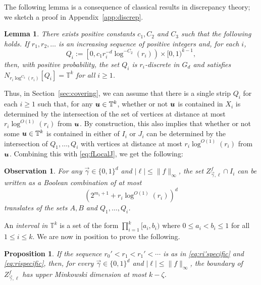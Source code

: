 \documentclass[12pt,a4paper]{amsart}
\numberwithin{equation}{section}
\newtheorem{lemma}[equation]{Lemma}
\newtheorem{proposition}[equation]{Proposition}
\newtheorem{obs}[equation]{Observation}
\theoremstyle{definition}
\begin{document}
The following lemma is a consequence of classical results in discrepancy theory; we sketch a proof in Appendix~\ref{app:discrep}.


\begin{lemma}
\label{lem:stripLem}
There exists positive constants $c_1,C_2$ and $C_3$ such that the following holds. If $r_1,r_2,\dots$ is an increasing sequence of positive integers and, for each $i$,  
\[Q_i:=\left[0, c_1r_i^{-d}\log^{-C_2}(r_i)\right)\times [0,1)^{k-1},\]
then, with positive probability, the set $Q_i$ is $r_i$-discrete in $G_d$ and satisfies $N_{r_i\log^{C_3}(r_i)}[Q_{i}]=\mathbb{T}^k$ for all $i\geq1$.
\end{lemma}

Thus, in Section~\ref{sec:covering}, we can assume that there is a single strip $Q_i$ for each $i\geq1$ such that, for any $\boldsymbol{u}\in \mathbb{T}^k$, whether or not $\boldsymbol{u}$ is contained in $X_i$ is determined by the intersection of the set of vertices at distance at most $r_i\log^{O(1)}(r_i)$ from $\boldsymbol{u}$. By construction, this also implies that whether or not some $\boldsymbol{u}\in\mathbb{T}^k$ is contained in either of $I_i$ or $J_i$ can be determined by the intersection of $Q_1,\dots,Q_i$ with vertices at distance at most $r_i\log^{O(1)}(r_i)$ from $\boldsymbol{u}$. Combining this with \eqref{eq:fLocalJ}, we get the following:

\begin{obs}
\label{obs:booleanABQ}
For any $\vec{\gamma}\in \{0,1\}^d$ and $|\ell|\leq \|f\|_\infty$, the set $Z_{\vec{\gamma},\ell}^f\cap I_i$ can be written as a Boolean combination of at most
\[\left(2^{m_i+1} + r_i\log^{O(1)}(r_i)\right)^d\] 
translates of the sets $A,B$ and $Q_1,\dots,Q_i$. 
\end{obs} 

An \emph{interval in} $\mathbb{T}^k$ is a set of the form $\prod_{i=1}^k[a_i,b_i)$ where $0\leq a_i<b_i\leq 1$ for all $1\leq i\leq k$.  We are now in position to prove the following.

\begin{proposition}
\label{prop:bdyDim}
If the sequence $r_0'<r_1<r_1'<\cdots$ is as in \eqref{eq:ri'specific} and \eqref{eq:rispecific}, then, for every $\vec{\gamma}\in\{0,1\}^d$ and $|\ell|\leq \|f\|_\infty$, the boundary of $Z_{\vec{\gamma},\ell}^f$ has upper Minkowski dimension at most $k-\zeta$.
\end{proposition}
\end{document}
